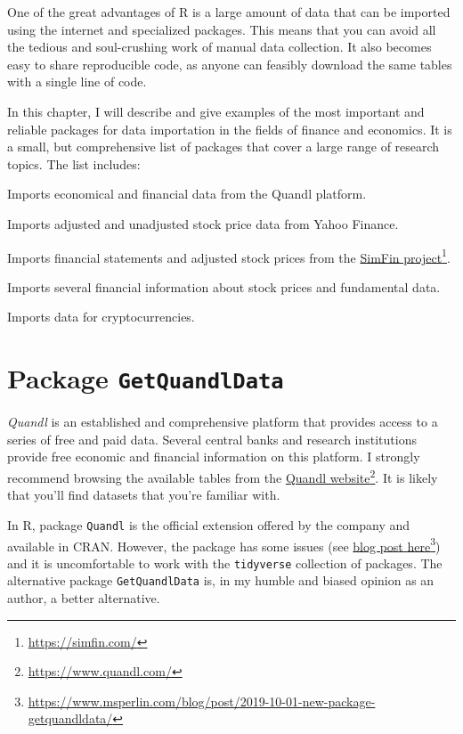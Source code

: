 \documentclass[
  12pt,
]{book}
\providecommand{\tightlist}{%
  \setlength{\itemsep}{0pt}\setlength{\parskip}{0pt}}
\begin{document}
One of the great advantages of R is a large amount of data that can be imported using the internet and specialized packages. This means that you can avoid all the tedious and soul-crushing work of manual data collection. It also becomes easy to share reproducible code, as anyone can feasibly download the same tables with a single line of code.

In this chapter, I will describe and give examples of the most important and reliable packages for data importation in the fields of finance and economics. It is a small, but comprehensive list of packages that cover a large range of research topics. The list includes:

\begin{description}
\tightlist
\item[\texttt{GetQuandlData} \citep{R-GetQuandlData}]
Imports economical and financial data from the Quandl platform.
\item[\texttt{BatchGetSymbols} \citep{R-BatchGetSymbols}]
Imports adjusted and unadjusted stock price data from Yahoo Finance.
\item[\texttt{simfinR} \citep{R-simfinR}]
Imports financial statements and adjusted stock prices from the \href{https://simfin.com/}{SimFin project}\footnote{\url{https://simfin.com/}}.
\item[\texttt{tidyquant} \citep{R-tidyquant}]
Imports several financial information about stock prices and fundamental data.
\item[\texttt{Rbitcoin} \citep{R-Rbitcoin}]
Imports data for cryptocurrencies.
\end{description}

\hypertarget{quandl}{%
\section{\texorpdfstring{Package \texttt{GetQuandlData}}{Package GetQuandlData}}\label{quandl}}

\emph{Quandl} is an established and comprehensive platform that provides access to a series of free and paid data. Several central banks and research institutions provide free economic and financial information on this platform. I strongly recommend browsing the available tables from the \href{https://www.quandl.com/}{Quandl website}\footnote{\url{https://www.quandl.com/}}. It is likely that you'll find datasets that you're familiar with. 

In R, package \texttt{Quandl} \citep{R-Quandl} is the official extension offered by the company and available in CRAN. However, the package has some issues (see \href{https://www.msperlin.com/blog/post/2019-10-01-new-package-getquandldata/}{blog post here}\footnote{\url{https://www.msperlin.com/blog/post/2019-10-01-new-package-getquandldata/}}) and it is uncomfortable to work with the \texttt{tidyverse} collection of packages. The alternative package \texttt{GetQuandlData} \citep{R-GetQuandlData} is, in my humble and biased opinion as an author, a better alternative.
\end{document}
